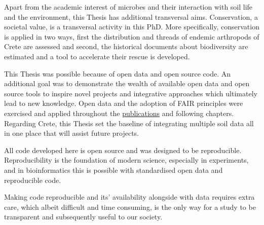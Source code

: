 Apart from the academic interest of microbes and their 
interaction with soil life and the environment, this Thesis 
has additional transversal aims. 
Conservation, a societal value, is a transversal activity 
in this PhD. More specifically, conservation is applied 
in two ways, first the distribution and threads of endemic arthropods of Crete are assessed 
and second, the historical documents about biodiversity are estimated and a tool to 
accelerate their rescue is developed. 

This Thesis was possible because of open data and open source code.
An additional goal was to demonstrate
the wealth of available open data
and open source tools to inspire novel projects and integrative approaches
which ultimately lead to new knowledge.
Open data and the adoption of FAIR principles 
were exercised and applied throughout the \hyperref[app:publications]{publications} and following chapters.
Regarding Crete, this Thesis set the baseline of integrating 
multiple soil data all in one place that will assist future projects. 

All code developed here is open source and was designed to be reproducible. 
Reproducibility is the foundation of modern science, 
especially in experiments,
and in bioinformatics this is possible 
with standardised open data and reproducible code.

Making code reproducible and its' availability alongside with data 
requires extra care, which albeit difficult and time consuming, 
is the only way for a study to be transparent and subsequently 
useful to our society.


